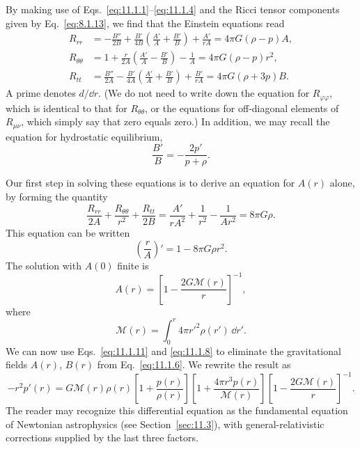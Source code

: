 By making use of Eqs.~\eqref{eq:11.1.1}--\eqref{eq:11.1.4} and the Ricci
tensor components given by Eq.~\eqref{eq:8.1.13}, we find that the Einstein
equations read
\begin{align}
  R_{rr}
  &=
  -\frac{B''}{2B}
  +\frac{B'}{4B}\left(\frac{A'}A+\frac{B'}B\right)
  +\frac{A'}{rA}
  =4\pi G(\rho-p)A,
  \tag{11.1.5}\label{eq:11.1.5}\\
  R_{\theta\theta}
  &=
  1+\frac{r}{2A}\left(\frac{A'}A-\frac{B'}B\right)-\frac1A
  =4\pi G(\rho-p)r^2,
  \tag{11.1.6}\label{eq:11.1.6}\\
  R_{tt}
  &=
  \frac{B''}{2A}
  -\frac{B'}{4A}\left(\frac{A'}A+\frac{B'}B\right)
  +\frac{B'}{rA}
  =4\pi G(\rho+3p)B.
  \tag{11.1.7}\label{eq:11.1.7}
\end{align}
A prime denotes \(d/\dd r\). (We do not need to write down the equation for
\(R_{\varphi\varphi}\), which is identical to that for
\(R_{\theta\theta}\), or the equations for off-diagonal elements of
\(R_{\mu\nu}\), which simply say that zero equals zero.) In addition, we may
recall the equation for hydrostatic equilibrium,
\begin{equation}
  \frac{B'}B=-\frac{2p'}{p+\rho}.
  \tag{11.1.8}\label{eq:11.1.8}
\end{equation}

Our first step in solving these equations is to derive an equation for
\(A(r)\) alone, by forming the quantity
\begin{equation}
  \frac{R_{rr}}{2A}
  +\frac{R_{\theta\theta}}{r^2}
  +\frac{R_{tt}}{2B}
  =
  \frac{A'}{rA^2}+\frac1{r^2}-\frac1{Ar^2}
  =8\pi G\rho.
  \tag{11.1.9}\label{eq:11.1.9}
\end{equation}
This equation can be written
\begin{equation}
  \left(\frac rA\right)'=1-8\pi G\rho r^2.
  \tag{11.1.10}\label{eq:11.1.10}
\end{equation}
The solution with \(A(0)\) finite is
\begin{equation}
  A(r)=\left[1-\frac{2G\mathcal{M}(r)}r\right]^{-1},
  \tag{11.1.11}\label{eq:11.1.11}
\end{equation}
where
\begin{equation}
  \mathcal{M}(r)=\int_0^r4\pi r'^2\rho(r')\,\dd r'.
  \tag{11.1.12}\label{eq:11.1.12}
\end{equation}
We can now use Eqs.~\eqref{eq:11.1.11} and \eqref{eq:11.1.8} to eliminate
the gravitational fields \(A(r)\), \(B(r)\) from
Eq.~\eqref{eq:11.1.6}. We rewrite the result as
\begin{equation}
  -r^2p'(r)
  =
  G\mathcal{M}(r)\rho(r)
  \left[1+\frac{p(r)}{\rho(r)}\right]
  \left[1+\frac{4\pi r^3p(r)}{\mathcal{M}(r)}\right]
  \left[1-\frac{2G\mathcal{M}(r)}r\right]^{-1}.
  \tag{11.1.13}\label{eq:11.1.13}
\end{equation}
The reader may recognize this differential equation as the fundamental
equation of Newtonian astrophysics (see Section~\ref{sec:11.3}), with
general-relativistic corrections supplied by the last three factors.

